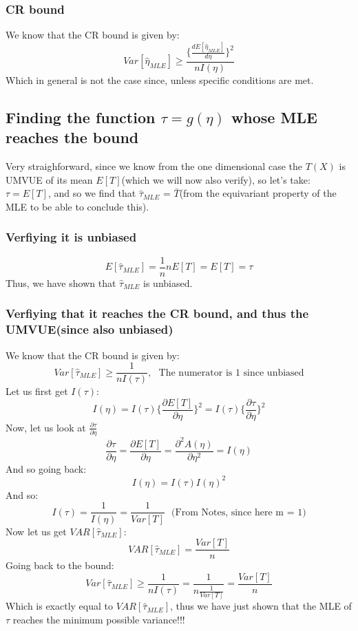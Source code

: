 \documentclass[12pt]{article}
\begin{document}
\subsubsection*{CR bound}
We know that the CR bound is given by:
\[
Var[\hat{\eta}_{MLE}] \geq \frac{\{\frac{dE[\hat{\eta}_{MLE}]}{d\eta}\}^2}{nI(\eta)}
\]
Which in general is not the case since, unless specific conditions are met. \\
\subsection*{Finding the function $\tau = g(\eta)$ whose MLE reaches the bound}
Very straighforward, since we know from the one dimensional case the $T(X)$ is UMVUE of its mean $E[T]$(which we will now also verify), so let's take: $\tau = E[T]$, and so we find that $\hat{\tau}_{MLE}$ = $\bar{T}$(from the equivariant property of the MLE to be able to conclude this).\\
\subsubsection*{Verfiying it is unbiased}
\[
E[\hat{\tau}_{MLE}]= \frac{1}{n} n E[T] = E[T] =\tau
\]
Thus, we have shown that $\hat{\tau}_{MLE}$ is unbiased. \\
\subsubsection*{Verfiying that it reaches the CR bound, and thus the UMVUE(since also unbiased)}
We know that the CR bound is given by:
\[
Var[\hat{\tau}_{MLE}] \geq \frac{1}{nI(\tau)}, \ \ \ \text{The numerator is 1 since unbiased}
\]
Let us first get $I(\tau)$:
\[
I(\eta) = I(\tau) \{\frac{\partial E[T]}{\partial \eta}\}^2 = I(\tau) \{\frac{\partial \tau}{\partial \eta}\}^2
\]
Now, let us look at  $\frac{\partial \tau}{\partial \eta}$
\[
  \frac{\partial \tau}{\partial \eta}= \frac{\partial E[T]}{\partial \eta} = \frac{\partial ^2 A(\eta)}{\partial \eta^2} = I(\eta)
\]
And so going back: 
\[
I(\eta) = I(\tau) I(\eta)^2
\]
And so: 
\[
I(\tau) = \frac{1}{I(\eta)} = \frac{1}{Var[T]} \ \ \ \text{(From Notes, since here m = 1)}
\]
Now let us get $VAR[\hat{\tau}_{MLE}]$: 
\[
  VAR[\hat{\tau}_{MLE}]= \frac{Var[T]}{n}
\]
Going back to the bound: 
\[
Var[\hat{\tau}_{MLE}] \geq \frac{1}{nI(\tau)} = \frac{1}{n\frac{1}{Var[T]}} = \frac{Var[T]}{n}
\]
Which is exactly equal to $VAR[\hat{\tau}_{MLE}]$, thus we have just shown that the MLE of $\tau$ reaches the minimum possible variance!!!
\end{document}
